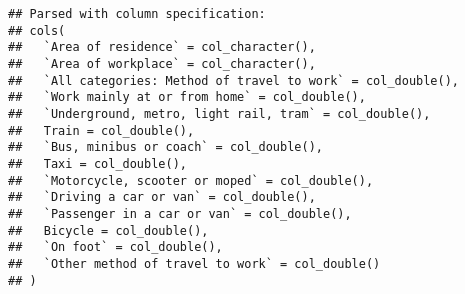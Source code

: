 \documentclass[]{elsarticle} %
\newenvironment{Shaded}{\begin{snugshade}}{\end{snugshade}}
\newcommand{\CommentTok}[1]{\textcolor[rgb]{0.56,0.35,0.01}{\textit{#1}}}
\newcommand{\DataTypeTok}[1]{\textcolor[rgb]{0.13,0.29,0.53}{#1}}
\newcommand{\KeywordTok}[1]{\textcolor[rgb]{0.13,0.29,0.53}{\textbf{#1}}}
\newcommand{\NormalTok}[1]{#1}
\newcommand{\OperatorTok}[1]{\textcolor[rgb]{0.81,0.36,0.00}{\textbf{#1}}}
\newcommand{\OtherTok}[1]{\textcolor[rgb]{0.56,0.35,0.01}{#1}}
\newcommand{\StringTok}[1]{\textcolor[rgb]{0.31,0.60,0.02}{#1}}
\begin{document}
\begin{Shaded}
\end{Shaded}

\begin{verbatim}
## Parsed with column specification:
## cols(
##   `Area of residence` = col_character(),
##   `Area of workplace` = col_character(),
##   `All categories: Method of travel to work` = col_double(),
##   `Work mainly at or from home` = col_double(),
##   `Underground, metro, light rail, tram` = col_double(),
##   Train = col_double(),
##   `Bus, minibus or coach` = col_double(),
##   Taxi = col_double(),
##   `Motorcycle, scooter or moped` = col_double(),
##   `Driving a car or van` = col_double(),
##   `Passenger in a car or van` = col_double(),
##   Bicycle = col_double(),
##   `On foot` = col_double(),
##   `Other method of travel to work` = col_double()
## )
\end{verbatim}
\end{document}
